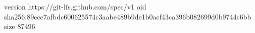 version https://git-lfs.github.com/spec/v1
oid sha256:89ccc7afbdc600625574c3aabe489b9de1b0acf43ca396b082699d0b9744c6bb
size 87496
